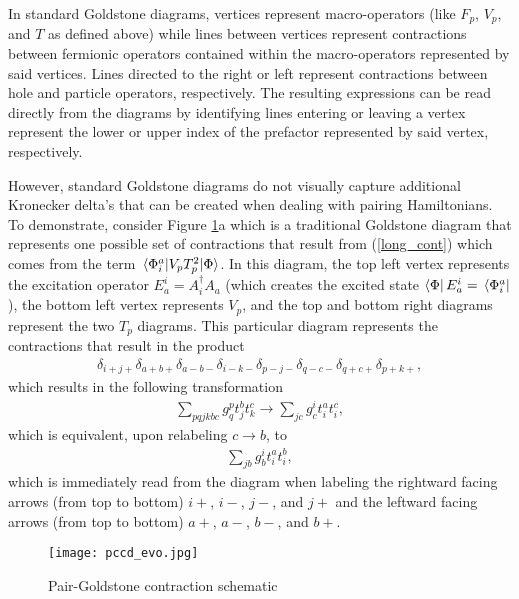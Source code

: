 \documentclass[Dual]{msu-thesis}
\begin{document}
In standard Goldstone diagrams, vertices represent macro-operators (like $F_p$, $V_p$, and $T$ as defined above) while lines between vertices represent contractions between fermionic operators contained within the macro-operators represented by said vertices. Lines directed to the right or left represent contractions between hole and particle operators, respectively. The resulting expressions can be read directly from the diagrams by identifying lines entering or leaving a vertex represent the lower or upper index of the prefactor represented by said vertex, respectively. 

However, standard Goldstone diagrams do not visually capture additional Kronecker delta's that can be created when dealing with pairing Hamiltonians. To demonstrate, consider Figure \ref{fig:pgd_cont}a which is a traditional Goldstone diagram that represents one possible set of contractions that result from (\ref{long_cont}) which comes from the term $\mel*{\Phi^a_i}{V_pT^2_p}{\Phi}$. In this diagram, the top left vertex represents the excitation operator $E^i_a= A^\dagger_iA_a$ (which creates the excited state $\bra{\Phi}E_a^i=\bra*{\Phi^a_i}$), the bottom left vertex represents $V_p$, and the top and bottom right diagrams represent the two $T_p$ diagrams. This particular diagram represents the contractions that result in the product 
\begin{align}
\delta_{i+j+}\delta_{a+b+}\delta_{a-b-}\delta_{i-k-}\delta_{p-j-}\delta_{q-c-}\delta_{q+c+}\delta_{p+k+}
,\end{align}
which results in the following transformation
\begin{align}
\sum_{pqjkbc}g^p_qt^b_jt^c_k\to\sum_{jc}g^i_ct^a_it^c_i
,\end{align}
which is equivalent, upon relabeling $c\to b$, to
\begin{align}
\label{pgd_final}
\sum_{jb}g^i_bt^a_it^b_i
,\end{align}
which is immediately read from the diagram when labeling the rightward facing arrows (from top to bottom) $i+$, $i-$, $j-$, and $j+$ and the leftward facing arrows (from top to bottom) $a+$, $a-$, $b-$, and $b+$.

\begin{figure}[t]
    \centering
    \texttt{[image: pccd\_evo.jpg]}
    \caption{Pair-Goldstone contraction schematic}
    \label{fig:pgd_cont}
\end{figure}
\end{document}
